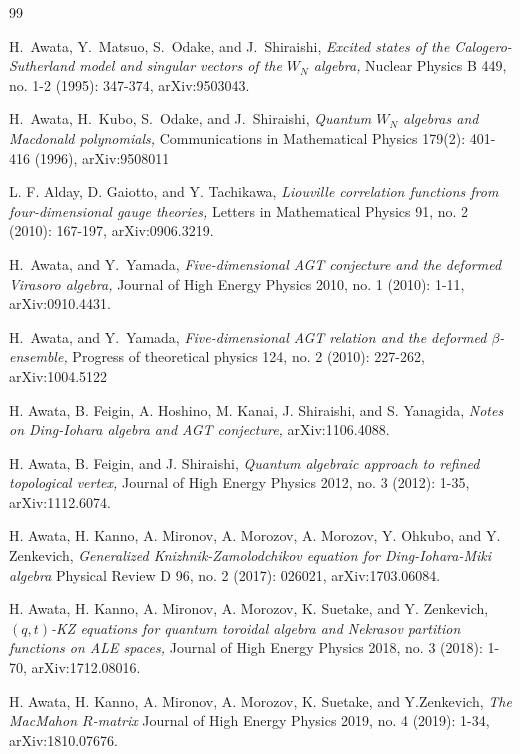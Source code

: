 \documentclass[12pt,reqno,a4paper]{amsart}
\numberwithin{equation}{section}
\theoremstyle{definition}
\begin{document}
	
\begin{thebibliography}{99}



H.~Awata, Y.~Matsuo, S.~Odake, and J.~Shiraishi, 
{\it Excited states of the Calogero-Sutherland model and singular vectors of the $W_N$ algebra,}
Nuclear Physics B 449, no. 1-2 (1995): 347-374, 
arXiv:9503043. 

H.~Awata, H.~Kubo, S.~Odake, and J.~Shiraishi, 
{\it Quantum $W_N$ algebras and Macdonald polynomials,}
Communications in Mathematical Physics 179(2): 401-416 (1996), 
arXiv:9508011

L. F. Alday, D. Gaiotto, and Y. Tachikawa,
{\it Liouville correlation functions from four-dimensional gauge theories,}
Letters in Mathematical Physics 91, no. 2 (2010): 167-197,
arXiv:0906.3219. 

H.~Awata, and Y.~Yamada,
{\it Five-dimensional AGT conjecture and the deformed Virasoro algebra,}
Journal of High Energy Physics 2010, no. 1 (2010): 1-11, 
arXiv:0910.4431. 

H.~Awata, and Y.~Yamada,
{\it Five-dimensional AGT relation and the deformed $\beta$-ensemble,}
Progress of theoretical physics 124, no. 2 (2010): 227-262, 
arXiv:1004.5122

H. Awata, B. Feigin, A. Hoshino, M. Kanai, J. Shiraishi, and S. Yanagida,
{\it Notes on Ding-Iohara algebra and AGT conjecture,}
arXiv:1106.4088.

H. Awata, B. Feigin, and J. Shiraishi,
{\it Quantum algebraic approach to refined topological vertex,}
Journal of High Energy Physics 2012, no. 3 (2012): 1-35, 
arXiv:1112.6074. 


H. Awata, H. Kanno, A. Mironov, A. Morozov, A. Morozov, Y. Ohkubo, and Y. Zenkevich, 
{\it Generalized Knizhnik-Zamolodchikov equation for Ding-Iohara-Miki algebra}
Physical Review D 96, no. 2 (2017): 026021, 
arXiv:1703.06084.

H. Awata, H. Kanno, A. Mironov, A. Morozov, K. Suetake, and Y. Zenkevich,
{\it $(q,t)$-KZ equations for quantum toroidal algebra and Nekrasov partition functions on ALE spaces,}
Journal of High Energy Physics 2018, no. 3 (2018): 1-70,
arXiv:1712.08016.

H. Awata, H. Kanno, A. Mironov, A. Morozov, K. Suetake, and Y.Zenkevich,
{\it The MacMahon $R$-matrix}
Journal of High Energy Physics 2019, no. 4 (2019): 1-34, 
arXiv:1810.07676.


\end{thebibliography}
\end{document}
